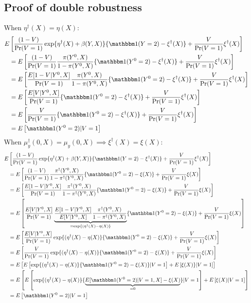 \begin{appendix}
\begin{refsection}
\subsection{Proof of double robustness}
When $\eta^\dagger(X) = \eta(X)$:
\begin{align*}
    E&\left[\dfrac{(1 - V)}{\Pr(V=1)} \exp\{\eta^\dagger(X) + \beta(Y,X)\}\{\mathbbm 1(Y = 2) - \xi^\dagger(X)\} + \dfrac{V}{\Pr(V=1)}\xi^\dagger(X) \right]\\
     &= E\left[\dfrac{(1 - V)}{\Pr(V=1)}  \dfrac{\pi(Y^0,X)}{1-\pi(Y^0,X)} \{\mathbbm 1(Y^0 = 2) - \xi^\dagger(X)\}  + \dfrac{V}{\Pr(V=1)}\xi^\dagger(X)\right] \\
      &= E\left[\dfrac{E[1-V|Y^0, X]}{\Pr(V=1)}  \dfrac{\pi(Y^0,X)}{1-\pi(Y^0,X)}\{\mathbbm 1(Y^0 = 2) - \xi^\dagger(X)\} + \dfrac{V}{\Pr(V=1)}\xi^\dagger(X)\right]\\
       &= E\left[\dfrac{E[V|Y^0, X]}{\Pr(V=1)} \{\mathbbm 1(Y^0 = 2) - \xi^\dagger(X)\} + \dfrac{V}{\Pr(V=1)}\xi^\dagger(X)\right] \\
       &= E\left[\dfrac{V}{\Pr(V=1)} \{\mathbbm 1(Y^0 = 2) - \xi^\dagger(X)\} + \dfrac{V}{\Pr(V=1)}\xi^\dagger(X)\right]\\
        &= E\left[\mathbbm 1(Y^0 = 2) |V=1\right]
\end{align*}
When $\mu_y^\dagger(0,X) = \mu_y(0,X) \implies \xi^\dagger(X) = \xi(X)$:
\begin{align*}
     E&\left[\dfrac{(1 - V)}{\Pr(V=1)} \exp\{\eta^\dagger(X) + \beta(Y,X)\}\{\mathbbm 1(Y = 2) - \xi^\dagger(X)\} + \dfrac{V}{\Pr(V=1)}\xi^\dagger(X) \right]\\
     &= E\left[\dfrac{(1 - V)}{\Pr(V=1)} \dfrac{\pi^\dagger(Y^0,X)}{1-\pi^\dagger(Y^0, X)}\{\mathbbm 1(Y^0 = 2) - \xi(X)\} + \dfrac{V}{\Pr(V=1)}\xi(X) \right] \\
      &= E\left[\dfrac{E[1-V|Y^0, X] }{\Pr(V=1)} \dfrac{\pi^\dagger(Y^0,X)}{1-\pi^\dagger(Y^0, X)}\{\mathbbm 1(Y^0 = 2) - \xi(X)\} + \dfrac{V}{\Pr(V=1)}\xi(X) \right] \\
      &= E\left[\dfrac{ E[V|Y^0, X]}{\Pr(V=1)}\underbrace{\dfrac{E[1-V|Y^0, X]}{E[V|Y^0, X]} \dfrac{\pi^\dagger(Y^0,X)}{1-\pi^\dagger(Y^0, X)}}_{=\exp\{(\eta^\dagger(X) - \eta(X)\}}\{\mathbbm 1(Y^0 = 2) - \xi(X)\} + \dfrac{V}{\Pr(V=1)}\xi(X) \right] \\
      &= E\left[\dfrac{ E[V|Y^0, X]}{\Pr(V=1)}\exp\{(\eta^\dagger(X) - \eta(X)\}\{\mathbbm 1(Y^0 = 2) - \xi(X)\} + \dfrac{V}{\Pr(V=1)}\xi(X) \right] \\
      &= E\left[\dfrac{V}{\Pr(V=1)}\exp\{(\eta^\dagger(X) - \eta(X)\}\{\mathbbm 1(Y^0 = 2) - \xi(X)\} + \dfrac{V}{\Pr(V=1)}\xi(X) \right] \\
      &= E\left[E\left[\exp\{(\eta^\dagger(X) - \eta(X)\}\{\mathbbm 1(Y^0 = 2) - \xi(X)\} | V = 1\right] + E\left[\xi(X)\} |V=1\right]\right] \\
      &= E\left[E\left[\exp\{(\eta^\dagger(X) - \eta(X)\}\{\underbrace{ E[\mathbbm1(Y^0 = 2)|V=1,X] - \xi(X)}_{=0}\} | V = 1\right] + E\left[\xi(X) |V=1\right]\right] \\
        &= E\left[\mathbbm1(Y^0 = 2)|V=1\right]
\end{align*}
\newpage

\end{refsection}
\end{appendix}
